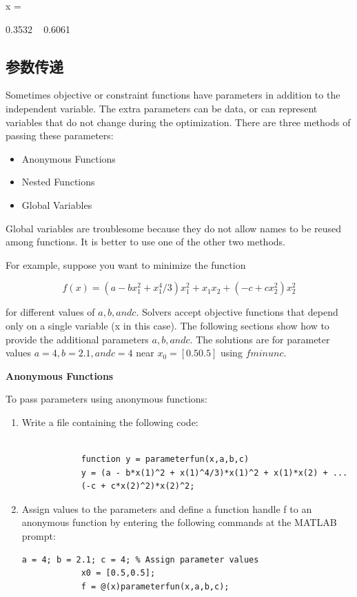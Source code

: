 \documentclass[10pt,math=newtx,citestyle=gb7714-2015,bibstyle=gb7714-2015]{elegantbook}
\begin{document}
{{{	
	x =
	
	0.3532  ~  0.6061
	
	\subsection{参数传递}
	
	Sometimes objective or constraint functions have parameters in addition to the independent variable. The extra parameters can be data, or can represent variables that do not change during the optimization. There are three methods of passing these parameters:
	
	\begin{itemize}
		\item Anonymous Functions
		
		\item Nested Functions
		
		\item Global Variables
		
		
	\end{itemize}
	
	Global variables are troublesome because they do not allow names to be reused among functions. It is better to use one of the other two methods.
	
	For example, suppose you want to minimize the function
	
	$$f(x)=(a-bx_1^2+x_1^4/3)x_1^2+x_1x_2+(-c+cx_2^2)x_2^2$$
	
	for different values of $a, b, and c$. Solvers accept objective functions that depend only on a single variable (x in this case). The following sections show how to provide the additional parameters $a, b, and c$. The solutions are for parameter values $a = 4, b = 2.1, and c = 4$ near $x_0 = [0.5 0.5]$ using $fminunc$.
	
	\textbf{Anonymous Functions}
	
	To pass parameters using anonymous functions:
	
	\begin{enumerate}
		\item Write a file containing the following code:
		\begin{lstlisting}[frame=shadowbox]
			
			function y = parameterfun(x,a,b,c)
			y = (a - b*x(1)^2 + x(1)^4/3)*x(1)^2 + x(1)*x(2) + ...
			(-c + c*x(2)^2)*x(2)^2;
		\end{lstlisting}
		
		\item Assign values to the parameters and define a function handle f to an anonymous function by entering the following commands at the MATLAB prompt:
		\begin{lstlisting}[frame=shadowbox]
			a = 4; b = 2.1; c = 4; % Assign parameter values
			x0 = [0.5,0.5];
			f = @(x)parameterfun(x,a,b,c);
		\end{lstlisting}
		

\end{enumerate}}}}
\end{document}

